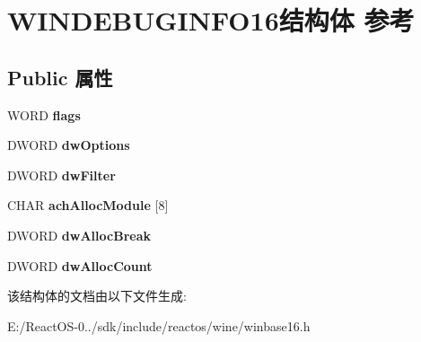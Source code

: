 \hypertarget{struct_w_i_n_d_e_b_u_g_i_n_f_o16}{}\section{W\+I\+N\+D\+E\+B\+U\+G\+I\+N\+F\+O16结构体 参考}
\label{struct_w_i_n_d_e_b_u_g_i_n_f_o16}
\subsection*{Public 属性}
\begin{DoxyCompactItemize}
\item 
\mbox{\label{struct_w_i_n_d_e_b_u_g_i_n_f_o16_af86ae5751d057e2cc02516c4dc538f72}} 
W\+O\+RD {\bfseries flags}
\item 
\mbox{\label{struct_w_i_n_d_e_b_u_g_i_n_f_o16_a1b2b71770bcc2f0368942f4f7ab273f9}} 
D\+W\+O\+RD {\bfseries dw\+Options}
\item 
\mbox{\label{struct_w_i_n_d_e_b_u_g_i_n_f_o16_a716bf36ab8d36bc5fb4dfb9d83baecd2}} 
D\+W\+O\+RD {\bfseries dw\+Filter}
\item 
\mbox{\label{struct_w_i_n_d_e_b_u_g_i_n_f_o16_ad0d6dd12ddeac545c9dceb51858c18bb}} 
C\+H\+AR {\bfseries ach\+Alloc\+Module} \mbox{[}8\mbox{]}
\item 
\mbox{\label{struct_w_i_n_d_e_b_u_g_i_n_f_o16_a09f49e3a676a779c39d08a3feaff985b}} 
D\+W\+O\+RD {\bfseries dw\+Alloc\+Break}
\item 
\mbox{\label{struct_w_i_n_d_e_b_u_g_i_n_f_o16_a4faf1c654ed97f26b6c54543be2c9f4b}} 
D\+W\+O\+RD {\bfseries dw\+Alloc\+Count}
\end{DoxyCompactItemize}


该结构体的文档由以下文件生成\+:\begin{DoxyCompactItemize}
\item 
E\+:/\+React\+O\+S-\/0../sdk/include/reactos/wine/winbase16.\+h\end{DoxyCompactItemize}
